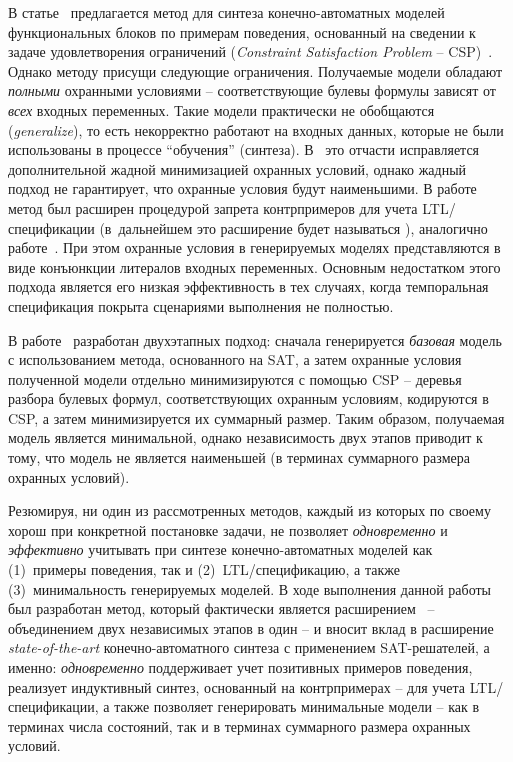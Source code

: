В статье~\cite{fbCSP} предлагается метод  для синтеза конечно-автоматных моделей функциональных блоков по примерам поведения, основанный на сведении к задаче удовлетворения ограничений (\textit{Constraint Satisfaction Problem} \--- CSP)~\cite{montanari1974}.
Однако методу  присущи следующие ограничения.
Получаемые модели обладают \textit{полными} охранными условиями \--- соответствующие булевы формулы зависят от \textit{всех} входных переменных.
Такие модели практически не обобщаются (\textit{generalize}), то есть некорректно работают на входных данных, которые не были использованы в процессе \enquote{обучения} (синтеза).
В~\cite{fbCSP} это отчасти исправляется дополнительной жадной минимизацией охранных условий, однако жадный подход не гарантирует, что охранные условия будут наименьшими.
В работе~\cite{chivilikhin-18} метод  был расширен процедурой запрета контрпримеров для учета LTL\-/спецификации (в~дальнейшем это расширение будет называться ), аналогично работе~\cite{efsm-tools}.
При этом охранные условия в генерируемых моделях представляются в виде конъюнкции литералов входных переменных.
Основным недостатком этого подхода является его низкая эффективность в тех случаях, когда темпоральная спецификация покрыта сценариями выполнения не полностью.

В работе~\cite{chivilikhin-19} разработан двухэтапных подход:
сначала генерируется \textit{базовая} модель с использованием метода, основанного на SAT, а затем охранные условия полученной модели отдельно минимизируются с помощью CSP \--- деревья разбора булевых формул, соответствующих охранным условиям, кодируются в CSP, а затем минимизируется их суммарный размер.
Таким образом, получаемая модель является минимальной, однако независимость двух этапов приводит к тому, что модель не является наименьшей (в терминах суммарного размера охранных условий).

Резюмируя, ни один из рассмотренных методов, каждый из которых по своему хорош при конкретной постановке задачи, не позволяет \textit{одновременно} и \textit{эффективно} учитывать при синтезе конечно-автоматных моделей как (1)~примеры поведения, так и (2)~LTL\-/спецификацию, а также (3)~минимальность генерируемых моделей.
В ходе выполнения данной работы был разработан метод, который фактически является расширением~\cite{chivilikhin-19} \--- объединением двух независимых этапов в один \--- и вносит вклад в расширение \textit{state-of-the-art} конечно-автоматного синтеза с применением SAT-решателей, а именно: \textit{одновременно} поддерживает учет позитивных примеров поведения, реализует индуктивный синтез, основанный на контрпримерах \--- для учета LTL\-/спецификации, а также позволяет генерировать минимальные модели \--- как в терминах числа состояний, так и в терминах суммарного размера охранных условий.

